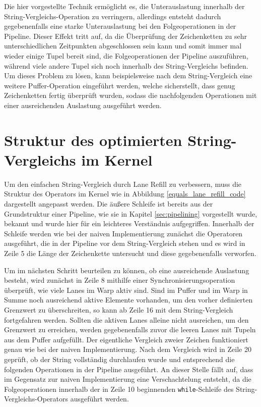 Die hier vorgestellte Technik ermöglicht es, die Unterauslastung innerhalb der String-Vergleichs-Operation zu verringern, allerdings entsteht dadurch gegebenenfalls eine starke Unterauslastung bei den Folgeoperationen in der Pipeline.
Dieser Effekt tritt auf, da die Überprüfung der Zeichenketten zu sehr unterschiedlichen Zeitpunkten abgeschlossen sein kann und somit immer mal wieder einige Tupel bereit sind, die Folgeoperationen der Pipeline auszuführen, während viele andere Tupel sich noch innerhalb des String-Vergleichs befinden.
Um dieses Problem zu lösen, kann beispielsweise nach dem String-Vergleich eine weitere Puffer-Operation eingeführt werden, welche sicherstellt, dass genug Zeichenketten fertig überprüft wurden, sodass die nachfolgenden Operationen mit einer ausreichenden Auslastung ausgeführt werden.

\section{Struktur des optimierten String-Vergleichs im Kernel}

Um den einfachen String-Vergleich durch Lane Refill zu verbessern, muss die Struktur des Operators im Kernel wie in Abbildung \ref{equals_lane_refill_code} dargestellt angepasst werden.
Die äußere Schleife ist bereits aus der Grundstruktur einer Pipeline, wie sie in Kapitel \ref{sec:pipelining} vorgestellt wurde, bekannt und wurde hier für ein leichteres Verständnis aufgegriffen.
Innerhalb der Schleife werden wie bei der naiven Implementierung zunächst die Operatoren ausgeführt, die in der Pipeline vor dem String-Vergleich stehen und es wird in Zeile 5 die Länge der Zeichenkette untersucht und diese gegebenenfalls verworfen.

Um im nächsten Schritt beurteilen zu können, ob eine ausreichende Auslastung besteht, wird zunächst in Zeile 8 mithilfe einer Synchronisierungsoperation überprüft, wie viele Lanes im Warp aktiv sind.
Sind im Puffer und im Warp in Summe noch ausreichend aktive Elemente vorhanden, um den vorher definierten Grenzwert zu überschreiten, so kann ab Zeile 16 mit dem String-Vergleich fortgefahren werden.
Sollten die aktiven Lanes alleine nicht ausreichen, um den Grenzwert zu erreichen, werden gegebenenfalls zuvor die leeren Lanes mit Tupeln aus dem Puffer aufgefüllt.
Der eigentliche Vergleich zweier Zeichen funktioniert genau wie bei der naiven Implementierung.
Nach dem Vergleich wird in Zeile 20 geprüft, ob der String vollständig durchlaufen wurde und entsprechend die folgenden Operationen in der Pipeline ausgeführt.
An dieser Stelle fällt auf, dass im Gegensatz zur naiven Implementierung eine Verschachtelung entsteht, da die Folgeoperationen innerhalb der in Zeile 10 beginnenden \texttt{while}-Schleife des String-Vergleichs-Operators ausgeführt werden.

